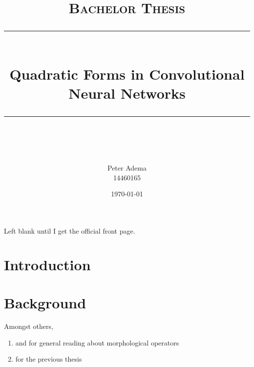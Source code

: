 \documentclass[11pt]{article} %
\title{	
    \vspace*{-1.5cm}
	\normalfont\normalsize
	\textsc{Bachelor Thesis}\\ %
	\vspace{3pt}
	\rule{\linewidth}{0.5pt}\\
	\vspace{14pt}
	{\huge Quadratic Forms in Convolutional Neural Networks}\\ %
	\vspace{4pt}
	\rule{\linewidth}{2pt}\\
	\vspace{4pt}
}
\author{
    \Large Peter Adema \\ 14460165
}
\date{\normalsize\today}  %
\def\comment#1{\color{red}#1\color{black}}
\begin{document}
\maketitle %

\comment{Left blank until I get the official front page.}
\newpage

\section{Introduction}
\section{Background}


Amongst others, \begin{enumerate}
	\item {} and  for general reading about morphological operators
	\item {} for the previous thesis
\end{enumerate}


\end{document}
